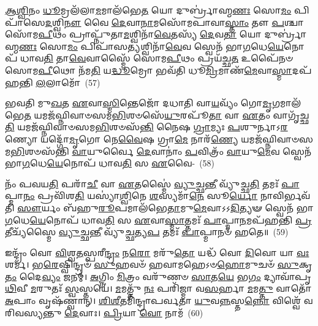 {\anuvakamend[{\-\ul{𑌅}\-\-\ul{𑌨𑍍𑌨𑌾}\-𑌦𑍋॑\-𑌽\-\ul{𑌨𑍍𑌨𑌾}\-𑌦 \ul{𑌏}\-𑌵 𑌭᳴𑌵𑌤𑍍𑌯𑌵𑌿\-\ul{𑌨𑍍𑌦}\-𑌨𑍍𑌪𑌞𑍍𑌚᳴𑌚𑌤𑍍𑌵𑌾𑌰𑌿𑍞𑌶𑌚𑍍𑌚}]}

\-\ul{𑌆}\-\-\ul{𑌶𑍍𑌵𑌿}\-𑌨𑌂 \ul{𑌧𑍂}\-𑌮𑍍𑌰𑌲᳴𑌲𑌾\-\ul{𑌮}\-𑌮𑌾\-𑌲᳴𑌭𑍇\-\ul{𑌤} 𑌯𑍋 𑌦𑍁𑌰𑍍𑌬𑍍𑌰𑌾॑𑌹𑍍𑌮\-\ul{𑌣𑌃} 𑌸𑍋\-\ul{𑌮𑌂} 𑌪𑌿𑌪𑌾᳴𑌸𑍇\-\ul{𑌦}\-𑌶𑍍𑌵𑌿\-\ul{𑌨𑍗} 𑌵𑍈 \ul{𑌦𑍇}\-𑌵𑌾\-\ul{𑌨𑌾}\-𑌮𑌸𑍋᳴𑌮𑌪𑌾𑌵𑌾\-\ul{𑌸𑍍𑌤𑌾𑌂} 𑌤𑍗 \ul{𑌪}\-𑌶𑍍𑌚𑌾 𑌸𑍋᳴𑌮\-\ul{𑌪𑍀}\-𑌥𑌂 𑌪𑍍𑌰𑌾𑌪𑍍𑌨𑍁᳴𑌤𑌾\-\ul{𑌮}\-𑌶𑍍𑌵𑌿𑌨𑌾᳴\-\ul{𑌵𑍇}\-𑌤𑌸𑍍𑌯᳴ \ul{𑌦𑍇}\-𑌵\-\ul{𑌤𑌾} 𑌯𑍋 𑌦𑍁𑌰𑍍𑌬𑍍𑌰𑌾॑𑌹𑍍𑌮\-\ul{𑌣𑌃} 𑌸𑍋\-\ul{𑌮𑌂} 𑌪𑌿𑌪𑌾᳴𑌸\-\ul{𑌤𑍍𑌯}\-𑌶𑍍𑌵𑌿𑌨𑌾᳴\-\ul{𑌵𑍇}\-𑌵 𑌸𑍍𑌵𑍇𑌨᳴ 𑌭𑌾\-\ul{𑌗}\-𑌧𑍇\-\ul{𑌯𑍇}\-𑌨𑍋𑌪᳴ 𑌧𑌾𑌵\-\ul{𑌤𑌿} 𑌤𑌾\-\ul{𑌵𑍇}\-𑌵𑌾𑌸𑍍𑌮𑍈᳴ 𑌸𑍋𑌮\-\ul{𑌪𑍀}\-𑌥𑌂 𑌪𑍍𑌰𑌯᳴𑌚𑍍𑌛\-\ul{𑌤} 𑌉𑌪𑍈᳴𑌨𑍞 𑌸𑍋𑌮\-\ul{𑌪𑍀}\-𑌥𑍋 𑌨᳴𑌮\-\ul{𑌤𑌿} 𑌯\-\ul{𑌦𑍍𑌧𑍂}\-𑌮𑍍𑌰𑍋 𑌭𑌵᳴𑌤𑌿 𑌧𑍂\-\ul{𑌮𑍍𑌰𑌿}\-𑌮𑌾𑌣᳴\-\ul{𑌮𑍇}\-𑌵𑌾\-\ul{𑌸𑍍𑌮𑌾}\-𑌦𑌪᳴𑌹𑌨𑍍𑌤𑌿 \ul{𑌲}\-𑌲𑌾𑌮𑍋᳴~(57)

𑌭𑌵𑌤𑌿 𑌮𑍁\-\ul{𑌖}\-𑌤 \ul{𑌏}\-𑌵𑌾\-\ul{𑌸𑍍𑌮𑌿}\-𑌨𑍍𑌤𑍇𑌜𑍋᳴ 𑌦𑌧𑌾𑌤𑌿 𑌵𑌾\-\ul{𑌯}\-𑌵𑍍𑌯𑌂᳴ 𑌗𑍋\-\ul{𑌮𑍃}\-𑌗𑌮𑌾\-𑌲᳴𑌭𑍇\-\ul{𑌤} 𑌯𑌮𑌜᳴𑌘𑍍𑌨𑌿𑌵𑌾𑍞𑌸𑌮\-\ul{𑌭𑌿}\-𑌶𑍞𑌸𑍇᳴\-\ul{𑌯𑍁}\-𑌰𑌪𑍂᳴\-\ul{𑌤𑌾} 𑌵𑌾 \ul{𑌏}\-𑌤𑌂 𑌵𑌾𑌗𑍃᳴𑌚𑍍𑌛\-\ul{𑌤𑌿} 𑌯𑌮𑌜᳴𑌘𑍍𑌨𑌿𑌵𑌾𑍞𑌸𑌮\-\ul{𑌭𑌿}\-𑌶𑍞𑌸᳴\-\ul{𑌨𑍍𑌤𑌿} 𑌨𑍈𑌷 \ul{𑌗𑍍𑌰𑌾}\-𑌮𑍍𑌯𑌃 \ul{𑌪}\-𑌶𑍁𑌰𑍍𑌨𑌾𑌽\-\ul{𑌰}\-𑌣𑍍𑌯𑍋 𑌯𑌦𑍍𑌗𑍋᳴\-\ul{𑌮𑍃}\-𑌗𑍋 𑌨𑍇\-\ul{𑌵𑍈}\-𑌷 𑌗𑍍𑌰𑌾\-\ul{𑌮𑍇} 𑌨𑌾𑌰᳴\-\ul{𑌣𑍍𑌯𑍇} 𑌯𑌮𑌜᳴𑌘𑍍𑌨𑌿𑌵𑌾𑍞𑌸𑌮\-\ul{𑌭𑌿}\-𑌶𑍞𑌸᳴𑌨𑍍𑌤𑌿 \ul{𑌵𑌾}\-𑌯𑍁𑌰𑍍𑌵𑍈 \ul{𑌦𑍇}\-𑌵𑌾𑌨𑌾𑌂॑ \ul{𑌪}\-𑌵𑌿𑌤𑍍𑌰𑌂᳴ \ul{𑌵𑌾}\-𑌯𑍁\-\ul{𑌮𑍇}\-𑌵 𑌸𑍍𑌵𑍇𑌨᳴ 𑌭𑌾\-\ul{𑌗}\-𑌧𑍇\-\ul{𑌯𑍇}\-𑌨𑍋𑌪᳴ 𑌧𑌾𑌵\-\ul{𑌤𑌿} 𑌸 \ul{𑌏}\-𑌵𑍈-~(58)

𑌨𑌂᳴ 𑌪𑌵𑌯\-\ul{𑌤𑌿} 𑌪𑌰𑌾᳴\-\ul{𑌚𑍀} 𑌵𑌾 \ul{𑌏}\-𑌤𑌸𑍍𑌮𑍈॑ \ul{𑌵𑍍𑌯𑍁}\-𑌚𑍍𑌛\-\ul{𑌨𑍍𑌤𑍀} 𑌵𑍍𑌯𑍁᳴𑌚𑍍𑌛\-\ul{𑌤𑌿} 𑌤𑌮𑌃᳴ \ul{𑌪𑌾}\-𑌪𑍍𑌮𑌾\-\ul{𑌨𑌂} 𑌪𑍍𑌰𑌵𑌿᳴𑌶\-\ul{𑌤𑌿} 𑌯𑌸𑍍𑌯𑌾॑\-\ul{𑌶𑍍𑌵𑌿}\-𑌨𑍇 \ul{𑌶}\-𑌸𑍍𑌯𑌮𑌾᳴\-\ul{𑌨𑍇} 𑌸𑍂\-\ul{𑌰𑍍𑌯𑍋} 𑌨𑌾𑌵𑌿𑌰𑍍𑌭𑌵᳴𑌤𑌿 \ul{𑌸𑍗}\-𑌰𑍍𑌯𑌂 𑌬᳴𑌹𑍁\-\ul{𑌰𑍂}\-𑌪𑌮𑌾𑌲᳴𑌭𑍇\-\ul{𑌤𑌾}\-𑌮𑍁\-\ul{𑌮𑍇}\-𑌵𑌾𑌽𑌽\-\ul{𑌦𑌿}\-𑌤𑍍𑌯𑍟 𑌸𑍍𑌵𑍇𑌨᳴ 𑌭𑌾\-\ul{𑌗}\-𑌧𑍇\-\ul{𑌯𑍇}\-𑌨𑍋𑌪᳴ 𑌧𑌾𑌵\-\ul{𑌤𑌿} 𑌸 \ul{𑌏}\-𑌵𑌾\-\ul{𑌸𑍍𑌮𑌾}\-𑌤𑍍𑌤𑌮𑌃᳴ \ul{𑌪𑌾}\-𑌪𑍍𑌮𑌾\-\ul{𑌨}\-𑌮𑌪᳴𑌹𑌨𑍍𑌤𑌿 \ul{𑌪𑍍𑌰}\-𑌤𑍀𑌚𑍍𑌯᳴𑌸𑍍𑌮𑍈 \ul{𑌵𑍍𑌯𑍁}\-𑌚𑍍𑌛\-\ul{𑌨𑍍𑌤𑍀} 𑌵𑍍𑌯𑍁᳴\-\ul{𑌚𑍍𑌛}\-𑌤𑍍𑌯\-\ul{𑌪} 𑌤𑌮𑌃᳴ \ul{𑌪𑌾}\-𑌪𑍍𑌮𑌾𑌨𑍞᳴ 𑌹𑌤𑍇॥~(59)

{\anuvakamend[{\-\ul{𑌲}\-𑌲𑌾\-\ul{𑌮𑌃} 𑌸 \ul{𑌏}\-𑌵 𑌷𑌟𑍍𑌚᳴𑌤𑍍𑌵𑌾𑌰𑌿𑍞𑌶𑌚𑍍𑌚}]}%

𑌇𑌨𑍍𑌦𑍍𑌰𑌂᳴ 𑌵𑍋 \ul{𑌵𑌿}\-𑌶𑍍𑌵\-\ul{𑌤}\-𑌸𑍍𑌪𑌰𑍀\-\ul{𑌨𑍍𑌦𑍍𑌰𑌂} 𑌨\-\ul{𑌰𑍋} 𑌮𑌰𑍁᳴\-\ul{𑌤𑍋} 𑌯𑌦𑍍𑌧᳴ 𑌵𑍋 \ul{𑌦𑌿}\-𑌵𑍋 𑌯𑌾 \ul{𑌵𑌃} 𑌶𑌰𑍍𑌮᳴। 𑌭\-\ul{𑌰𑍇}\-𑌷𑍍𑌵𑌿𑌨𑍍𑌦𑍍𑌰𑍞᳴ \ul{𑌸𑍁}\-𑌹𑌵𑍞᳴ 𑌹𑌵𑌾𑌮𑌹𑍇\-𑌽𑍞\-\ul{𑌹𑍋}\-𑌮𑍁𑌚𑍞᳴ \ul{𑌸𑍁}\-𑌕𑍃\-\ul{𑌤𑌂} 𑌦𑍈\-\ul{𑌵𑍍𑌯𑌂} 𑌜𑌨𑌮𑍍॑। \ul{𑌅}\-𑌗𑍍𑌨𑌿𑌂 \ul{𑌮𑌿}\-𑌤𑍍𑌰𑌂 𑌵𑌰𑍁᳴𑌣𑍞 \ul{𑌸𑌾}\-𑌤\-\ul{𑌯𑍇} 𑌭\-\ul{𑌗𑌂} 𑌦𑍍𑌯𑌾𑌵𑌾᳴𑌪𑍃\-\ul{𑌥𑌿}\-𑌵𑍀 \ul{𑌮}\-𑌰𑍁𑌤𑌃᳴ \ul{𑌸𑍍𑌵}\-𑌸𑍍𑌤𑌯𑍇॑। \ul{𑌮}\-𑌮𑌤𑍍𑌤𑍁᳴ \ul{𑌨𑌃} 𑌪𑌰𑌿᳴𑌜𑍍𑌮𑌾 𑌵\-\ul{𑌸}\-𑌰𑍍\mbox{}𑌹𑌾 \ul{𑌮}\-𑌮\-\ul{𑌤𑍍𑌤𑍁} 𑌵𑌾𑌤𑍋᳴ \ul{𑌅}\-𑌪𑌾𑌂 𑌵𑍃𑌷᳴𑌣𑍍𑌵𑌾𑌨𑍍। \ul{𑌶𑌿}\-\-\ul{𑌶𑍀}\-𑌤𑌮𑌿᳴𑌨𑍍𑌦𑍍𑌰𑌾𑌪𑌰𑍍𑌵𑌤𑌾 \ul{𑌯𑍁}\-𑌵\-\ul{𑌨𑍍𑌨}\-𑌸𑍍𑌤\-\ul{𑌨𑍍𑌨𑍋} 𑌵𑌿𑌶𑍍𑌵𑍇᳴ 𑌵𑌰𑌿𑌵𑌸𑍍𑌯𑌨𑍍𑌤𑍁 \ul{𑌦𑍇}\-𑌵𑌾𑌃। \ul{𑌪𑍍𑌰𑌿}\-𑌯𑌾 \ul{𑌵𑍋} 𑌨𑌾𑌮᳴~(60)

